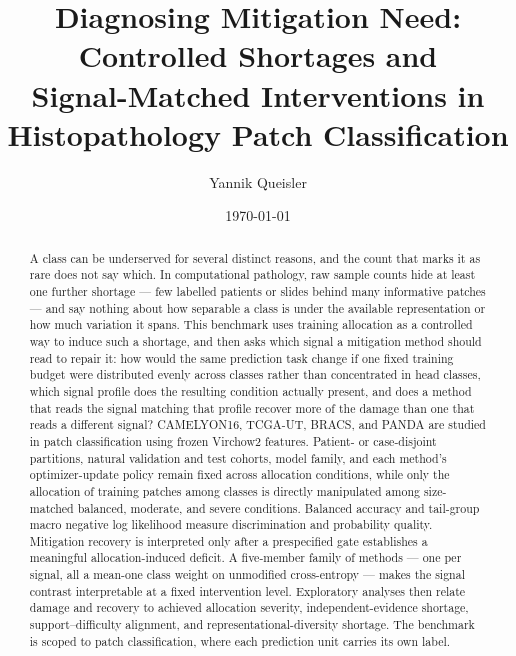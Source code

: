 \documentclass[11pt]{article}
\title{Diagnosing Mitigation Need: Controlled Shortages and\\
Signal-Matched Interventions in Histopathology Patch Classification}
\author{Yannik Queisler}
\date{\today}
\begin{document}
\raggedbottom
\hypersetup{pageanchor=false}
\begin{titlepage}
\centering
\vspace*{\fill}
\makeatletter
{\LARGE\bfseries \@title\par}
\vspace{1.5em}
{\large \@author\par}
\vspace{1.5em}
{\large \@date\par}
\makeatother

\begin{abstract}
\begingroup
\setlength{\emergencystretch}{2em}
\noindent A class can be underserved for several distinct reasons, and the count that marks it as rare does not say which. In computational pathology, raw sample counts hide at least one further shortage --- few labelled patients or slides behind many informative patches --- and say nothing about how separable a class is under the available representation or how much variation it spans. This benchmark uses training allocation as a controlled way to induce such a shortage, and then asks which signal a mitigation method should read to repair it: how would the same prediction task change if one fixed training budget were distributed evenly across classes rather than concentrated in head classes, which signal profile does the resulting condition actually present, and does a method that reads the signal matching that profile recover more of the damage than one that reads a different signal? CAMELYON16, TCGA-UT, BRACS, and PANDA are studied in patch classification using frozen Virchow2 features. Patient- or case-disjoint partitions, natural validation and test cohorts, model family, and each method's optimizer-update policy remain fixed across allocation conditions, while only the allocation of training patches among classes is directly manipulated among size-matched balanced, moderate, and severe conditions. Balanced accuracy and tail-group macro negative log likelihood measure discrimination and probability quality. Mitigation recovery is interpreted only after a prespecified gate establishes a meaningful allocation-induced deficit. A five-member family of methods --- one per signal, all a mean-one class weight on unmodified cross-entropy --- makes the signal contrast interpretable at a fixed intervention level. Exploratory analyses then relate damage and recovery to achieved allocation severity, independent-evidence shortage, support--difficulty alignment, and representational-diversity shortage. The benchmark is scoped to patch classification, where each prediction unit carries its own label.
\par
\endgroup
\end{abstract}
\vspace*{\fill}
\end{titlepage}
\hypersetup{pageanchor=true}
\end{document}
